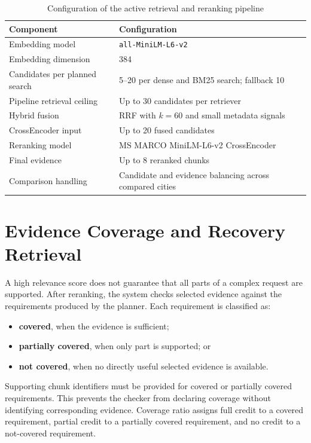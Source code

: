 \begin{table}[H]
\centering
\caption{Configuration of the active retrieval and reranking pipeline}
\label{tab:retrieval-configuration}
\begin{tabular}{p{} p{}}
\hline
\textbf{Component} & \textbf{Configuration} \\
\hline
Embedding model & \texttt{all-MiniLM-L6-v2} \\
Embedding dimension & 384 \\
Candidates per planned search & 5--20 per dense and BM25 search; fallback 10 \\
Pipeline retrieval ceiling & Up to 30 candidates per retriever \\
Hybrid fusion & RRF with $k=60$ and small metadata signals \\
CrossEncoder input & Up to 20 fused candidates \\
Reranking model & MS MARCO MiniLM-L6-v2 CrossEncoder \\
Final evidence & Up to 8 reranked chunks \\
Comparison handling & Candidate and evidence balancing across compared cities \\
\hline
\end{tabular}
\end{table}

\section{Evidence Coverage and Recovery Retrieval}

A high relevance score does not guarantee that all parts of a complex request
are supported. After reranking, the system checks selected evidence against the
requirements produced by the planner. Each requirement is classified as:

\begin{itemize}
    \item \textbf{covered}, when the evidence is sufficient;
    \item \textbf{partially covered}, when only part is supported; or
    \item \textbf{not covered}, when no directly useful selected evidence is
    available.
\end{itemize}

Supporting chunk identifiers must be provided for covered or partially covered
requirements. This prevents the checker from declaring coverage without
identifying corresponding evidence. Coverage ratio assigns full credit to a
covered requirement, partial credit to a partially covered requirement, and no
credit to a not-covered requirement.

